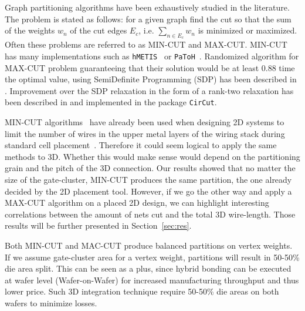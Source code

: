 \documentclass[conference]{IEEEtran}
\begin{document}
Graph partitioning algorithms have been exhaustively studied in the literature. The problem is stated as follows: for a given graph find the cut so that the sum of the weights $w_n$ of the cut edges $E_c$, i.e. $\sum_{n \in E_c} w_{n}$ is minimized or maximized. Often these problems are referred to as MIN-CUT and MAX-CUT. MIN-CUT has many implementations such as \texttt{hMETIS}~\cite{Karypis1999} or \texttt{PaToH}~\cite{Aykanat2011}. Randomized algorithm for MAX-CUT problem guaranteeing that their solution would be at least 0.88 time the optimal value, using SemiDefinite Programming (SDP) has been described in \cite{Goemans1995}. Improvement over the SDP relaxation in the form of a rank-two relaxation has been described in \cite{Burer2000} and implemented in the package \texttt{CirCut}.

MIN-CUT algorithms~\cite{Karypis1999,Aykanat2011,Caldwell2000} have already been used when designing 2D systems to limit the number of wires in the upper metal layers of the wiring stack during standard cell placement~\cite{KahngAndrewB.Lienig2011}. Therefore it could seem logical to apply the same methods to 3D. Whether this would make sense would depend on the partitioning grain and the pitch of the 3D connection. Our results showed that no matter the size of the gate-cluster, MIN-CUT produces the same partition, the one already decided by the 2D placement tool. However, if we go the other way and apply a MAX-CUT algorithm on a placed 2D design, we can highlight interesting correlations between the amount of nets cut and the total 3D wire-length. Those results will be further presented in Section~\ref{sec:res}.

Both MIN-CUT and MAC-CUT produce balanced partitions on vertex weights. If we assume gate-cluster area for a vertex weight, partitions will result in 50-50\% die area split. This can be seen as a plus, since hybrid bonding can be executed at wafer level (Wafer-on-Wafer) for increased manufacturing throughput and thus lower price. Such 3D integration technique require 50-50\% die areas on both wafers to minimize losses.
\end{document}

